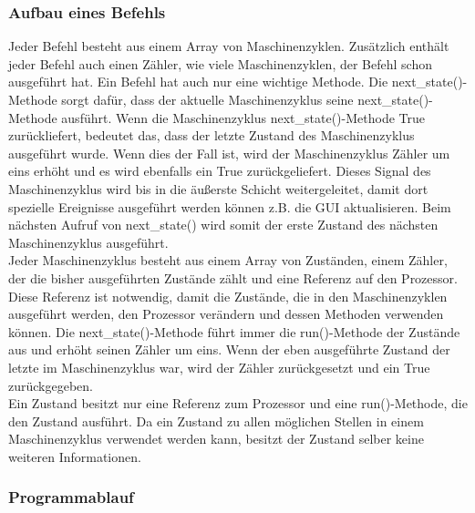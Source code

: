 \documentclass[12pt]{article}
\begin{document}
\subsubsection{Aufbau eines Befehls}

Jeder Befehl besteht aus einem Array von Maschinenzyklen. Zusätzlich enthält jeder Befehl auch einen Zähler, wie viele Maschinenzyklen, der Befehl schon ausgeführt hat. Ein Befehl hat auch nur eine wichtige Methode. Die next\_state()-Methode sorgt dafür, dass der aktuelle Maschinenzyklus seine next\_state()-Methode ausführt. Wenn die Maschinenzyklus next\_state()-Methode True zurückliefert, bedeutet das, dass der letzte Zustand des Maschinenzyklus ausgeführt wurde. Wenn dies der Fall ist, wird der Maschinenzyklus Zähler um eins erhöht und es wird ebenfalls ein True zurückgeliefert. Dieses Signal des Maschinenzyklus wird bis in die äußerste Schicht weitergeleitet, damit dort spezielle Ereignisse ausgeführt werden können z.B. die GUI aktualisieren. Beim nächsten Aufruf von next\_state() wird somit der erste Zustand des nächsten Maschinenzyklus ausgeführt.
\\

\noindent
Jeder Maschinenzyklus besteht aus einem Array von Zuständen, einem Zähler, der die bisher ausgeführten Zustände zählt und eine Referenz auf den Prozessor. Diese Referenz ist notwendig, damit die Zustände, die in den Maschinenzyklen ausgeführt werden, den Prozessor verändern und dessen Methoden verwenden können. Die next\_state()-Methode führt immer die run()-Methode der Zustände aus und erhöht seinen Zähler um eins. Wenn der eben ausgeführte Zustand der letzte im Maschinenzyklus war, wird der Zähler zurückgesetzt und ein True zurückgegeben.
\\

\noindent
Ein Zustand besitzt nur eine Referenz zum Prozessor und eine run()-Methode, die den Zustand ausführt. Da ein Zustand zu allen möglichen Stellen in einem Maschinenzyklus verwendet werden kann, besitzt der Zustand selber keine weiteren Informationen.


\subsubsection{Programmablauf}
\end{document}
